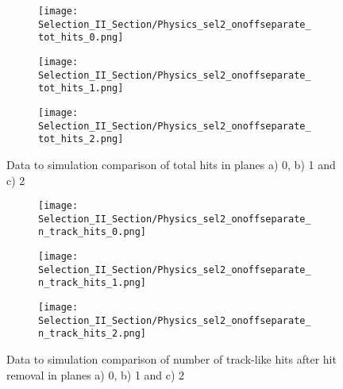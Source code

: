 \documentclass{article}
\begin{document}
\begin{figure}[t!]
\centering
  \begin{subfigure}[t]{0.3\textwidth}
    \centering
\texttt{[image: Selection\_II\_Section/Physics\_sel2\_onoffseparate\_tot\_hits\_0.png]}
   \caption{ }
  \end{subfigure} 
  \hspace{30 mm}
  \begin{subfigure}[t]{0.3\textwidth}
    \centering
\texttt{[image: Selection\_II\_Section/Physics\_sel2\_onoffseparate\_tot\_hits\_1.png]}
   \caption{ }
  \end{subfigure} 
  \hspace{30 mm}
  \begin{subfigure}[t]{0.3\textwidth}
    \centering
\texttt{[image: Selection\_II\_Section/Physics\_sel2\_onoffseparate\_tot\_hits\_2.png]}
   \caption{ }
  \end{subfigure} 
\caption{ Data to simulation comparison of total hits in planes a) 0, b) 1 and c) 2 } 
\label{fig:datamc_total_hits}
\end{figure}

\begin{figure}[t!]
\centering
  \begin{subfigure}[t]{0.3\textwidth}
    \centering
\texttt{[image: Selection\_II\_Section/Physics\_sel2\_onoffseparate\_n\_track\_hits\_0.png]}
   \caption{ }
  \end{subfigure} 
  \hspace{30 mm}
  \begin{subfigure}[t]{0.3\textwidth}
    \centering
\texttt{[image: Selection\_II\_Section/Physics\_sel2\_onoffseparate\_n\_track\_hits\_1.png]}
   \caption{ }
  \end{subfigure} 
  \hspace{30 mm}
  \begin{subfigure}[t]{0.3\textwidth}
    \centering
\texttt{[image: Selection\_II\_Section/Physics\_sel2\_onoffseparate\_n\_track\_hits\_2.png]}
   \caption{ }
  \end{subfigure} 
\caption{ Data to simulation comparison of number of track-like hits after hit removal in planes a) 0, b) 1 and c) 2 } 
\label{fig:datamc_tracklike_hits}
\end{figure}
\end{document}
